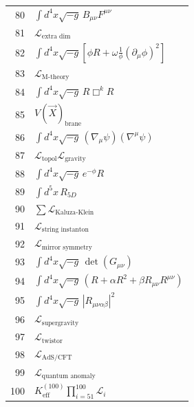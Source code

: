\documentclass[12pt,a4paper]{article}
\begin{document}
\begin{longtable}{r p{}}
	80 & \(\displaystyle \int d^4x\sqrt{-g}\,B_{\mu\nu}F^{\mu\nu}\) \\
	81 & \(\displaystyle \mathcal{L}_{\text{extra dim}}\) \\
	82 & \(\displaystyle \int d^4x\sqrt{-g}\left[\phi R + \omega\frac{1}{\phi}(\partial_\mu\phi)^2\right]\) \\
	83 & \(\displaystyle \mathcal{L}_{\text{M-theory}}\) \\
	84 & \(\displaystyle \int d^4x\sqrt{-g}\,R\Box^k R\) \\
	85 & \(\displaystyle V(\vec{X})_{\text{brane}}\) \\
	86 & \(\displaystyle \int d^4x\sqrt{-g}\,(\nabla_\mu\psi)(\nabla^\mu\psi)\) \\
	87 & \(\displaystyle \mathcal{L}_{\text{topol}}\mathcal{L}_{\text{gravity}}\) \\
	88 & \(\displaystyle \int d^4x\sqrt{-g}\,e^{-\phi}R\) \\
	89 & \(\displaystyle \int d^5x\,R_{5D}\) \\
	90 & \(\displaystyle \sum\mathcal{L}_{\text{Kaluza-Klein}}\) \\
	91 & \(\displaystyle \mathcal{L}_{\text{string instanton}}\) \\
	92 & \(\displaystyle \mathcal{L}_{\text{mirror symmetry}}\) \\
	93 & \(\displaystyle \int d^4x\sqrt{-g}\,\det(G_{\mu\nu})\) \\
	94 & \(\displaystyle \int d^4x\sqrt{-g}\,\left(R + \alpha R^2 + \beta R_{\mu\nu}R^{\mu\nu}\right)\) \\
	95 & \(\displaystyle \int d^4x\sqrt{-g}\,|R_{\mu\nu\alpha\beta}|^2\) \\
	96 & \(\displaystyle \mathcal{L}_{\text{supergravity}}\) \\
	97 & \(\displaystyle \mathcal{L}_{\text{twistor}}\) \\
	98 & \(\displaystyle \mathcal{L}_{\text{AdS/CFT}}\) \\
	99 & \(\displaystyle \mathcal{L}_{\text{quantum anomaly}}\) \\
	100 & \(\displaystyle K^{(100)}_{\mathrm{eff}}\prod_{i=51}^{100}\mathcal{L}_i\) \\
	

\end{longtable}
\end{document}
